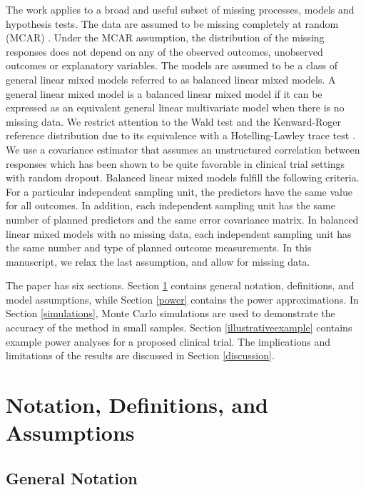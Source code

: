 \documentclass[11pt]{article}
\begin{document}
The work applies to a broad and useful subset of missing processes, models and hypothesis tests. The data are assumed to be missing completely at random (MCAR) \cite{little_statistical_2002}. Under the MCAR assumption, the distribution of the missing responses does not depend on any of the observed outcomes, unobserved outcomes or explanatory variables. The models are assumed to be a class of general linear mixed models \cite{laird_random-effects_1982} referred to as balanced linear mixed models\cite{muller_statistical_2007, ringham_multivariate_2016}. A general linear mixed model is a balanced linear mixed model if it can be expressed as an equivalent general linear multivariate model when there is no missing data. We restrict attention to the Wald test and the Kenward-Roger reference distribution \cite{barton_hypothesis_1989, catellier_tests_2000, ringham_multivariate_2016} due to its equivalence with a Hotelling-Lawley trace test \cite{mckeon_f_1974}. We use a covariance estimator that assumes an unstructured correlation between responses which has  been shown to be quite favorable in clinical trial settings with random dropout. \cite{gosho_comparison_2017} Balanced linear mixed models fulfill the following criteria. For a particular independent sampling unit, the predictors have the same value for all outcomes. In addition, each independent sampling unit has the same number of planned predictors and the same error covariance matrix. In balanced linear mixed models with no missing data, each independent sampling unit has the same number and type of planned outcome measurements. In this manuscript, we relax the last assumption, and allow for missing data. 

The paper has six sections. Section \ref{notation} contains general notation, definitions, and model assumptions, while Section \ref{power} contains the power approximations. In Section \ref{simulations}, Monte Carlo simulations are used to demonstrate the accuracy of the method in small samples. Section \ref{illustrativeexample} contains example power analyses for a proposed clinical trial. The implications and limitations of the results are discussed in Section \ref{discussion}.

\section{Notation, Definitions, and Assumptions}
\label{notation}

\subsection{General Notation}
\end{document}
